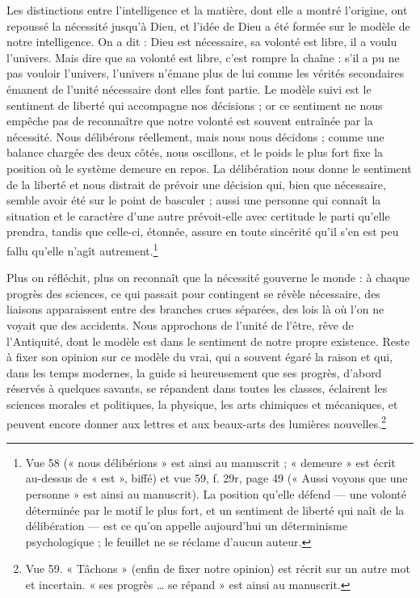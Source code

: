 \documentclass[11pt,a4paper]{article}
\begin{document}
Les distinctions entre l'intelligence et la matière, dont elle a montré
l'origine, ont repoussé la nécessité jusqu'à Dieu, et l'idée de Dieu a été
formée sur le modèle de notre intelligence. On a dit : Dieu est nécessaire, sa
volonté est libre, il a voulu l'univers. Mais dire que sa volonté est libre,
c'est rompre la chaîne : s'il a pu ne pas vouloir l'univers, l'univers n'émane
plus de lui comme les vérités secondaires émanent de l'unité nécessaire dont
elles font partie. Le modèle suivi est le sentiment de liberté qui accompagne nos
décisions ; or ce sentiment ne nous empêche pas de reconnaître que notre volonté
est souvent entraînée par la nécessité. Nous délibérons réellement, mais nous
nous décidons ; comme une balance chargée des deux côtés, nous oscillons, et le
poids le plus fort fixe la position où le système demeure en repos. La
délibération nous donne le sentiment de la liberté et nous distrait de prévoir
une décision qui, bien que nécessaire, semble avoir été sur le point de
basculer ; aussi une personne qui connaît la situation et le caractère d'une
autre prévoit-elle avec certitude le parti qu'elle prendra, tandis que
celle-ci, étonnée, assure en toute sincérité qu'il s'en est peu fallu qu'elle
n'agît autrement.\footnote{Vue 58 (« nous délibérions » est ainsi au manuscrit ;
« demeure » est écrit au-dessus de « est », biffé) et vue 59, f. 29r, page 49
(« Aussi voyons que une personne » est ainsi au manuscrit). La position qu'elle
défend — une volonté déterminée par le motif le plus fort, et un sentiment de
liberté qui naît de la délibération — est ce qu'on appelle aujourd'hui un
déterminisme psychologique ; le feuillet ne se réclame d'aucun auteur.}

Plus on réfléchit, plus on reconnaît que la nécessité gouverne le monde : à
chaque progrès des sciences, ce qui passait pour contingent se révèle nécessaire,
des liaisons apparaissent entre des branches crues séparées, des lois là où l'on
ne voyait que des accidents. Nous approchons de l'unité de l'être, rêve de
l'Antiquité, dont le modèle est dans le sentiment de notre propre existence.
Reste à fixer son opinion sur ce modèle du vrai, qui a souvent égaré la raison
et qui, dans les temps modernes, la guide si heureusement que ses progrès,
d'abord réservés à quelques savants, se répandent dans toutes les classes,
éclairent les sciences morales et politiques, la physique, les arts chimiques
et mécaniques, et peuvent encore donner aux lettres et aux beaux-arts des
lumières nouvelles.\footnote{Vue 59. « Tâchons » (enfin de fixer notre opinion)
est récrit sur un autre mot et incertain. « ses progrès \ldots{} se répand » est
ainsi au manuscrit.}
\end{document}

